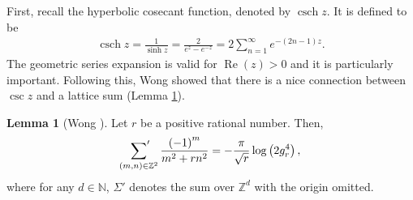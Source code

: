 \documentclass[11pt]{amsart}
\theoremstyle{definition}
\numberwithin{theorem}{section}
\newtheorem{lemma}[theorem]{Lemma}
\begin{document}
First, recall the hyperbolic cosecant function, denoted by $\operatorname{csch}z$. It is defined to be \begin{align*}
    \operatorname{csch}z=\frac{1}{\operatorname{sinh}z}=\frac{2}{e^z-e^{-z}}=2\sum_{n=1}^{\infty}e^{-\left(2n-1\right)z}.
\end{align*}
The geometric series expansion is valid for $\operatorname{Re} \left(z\right)>0$ and it is particularly important. Following this, Wong \cite{wong} showed that there is a nice connection between $\csc z$ and a lattice sum (Lemma \ref{wong's lemma}).
\begin{lemma}[Wong \cite{wong}]\label{wong's lemma}
Let $r$ be a positive rational number. Then, \begin{align}
\label{log formula}
\sideset{}{'}\sum_{\left(m,n\right)\in\mathbb Z^2}\frac{\left(-1\right)^m}{m^2+rn^2}=-\frac{\pi}{\sqrt{r}}\operatorname{log}\left(2g_r^4\right),
\end{align}
where for any $d\in\mathbb{N}$, $\Sigma'$ denotes the sum over $\mathbb{Z}^d$ with the origin omitted.
\end{lemma}
\end{document}
